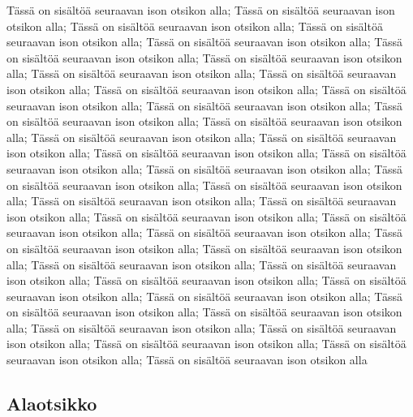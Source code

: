 \documentclass[a4paper]{article}
\begin{document}
Tässä on sisältöä seuraavan ison otsikon alla; Tässä on sisältöä seuraavan ison otsikon alla; Tässä on sisältöä seuraavan ison otsikon alla; Tässä on sisältöä seuraavan ison otsikon alla; Tässä on sisältöä seuraavan ison otsikon alla; Tässä on sisältöä seuraavan ison otsikon alla; Tässä on sisältöä seuraavan ison otsikon alla; Tässä on sisältöä seuraavan ison otsikon alla; Tässä on sisältöä seuraavan ison otsikon alla; Tässä on sisältöä seuraavan ison otsikon alla; Tässä on sisältöä seuraavan ison otsikon alla; Tässä on sisältöä seuraavan ison otsikon alla; Tässä on sisältöä seuraavan ison otsikon alla; Tässä on sisältöä seuraavan ison otsikon alla; Tässä on sisältöä seuraavan ison otsikon alla; Tässä on sisältöä seuraavan ison otsikon alla; Tässä on sisältöä seuraavan ison otsikon alla; Tässä on sisältöä seuraavan ison otsikon alla; Tässä on sisältöä seuraavan ison otsikon alla; Tässä on sisältöä seuraavan ison otsikon alla; Tässä on sisältöä seuraavan ison otsikon alla; Tässä on sisältöä seuraavan ison otsikon alla; Tässä on sisältöä seuraavan ison otsikon alla; Tässä on sisältöä seuraavan ison otsikon alla; Tässä on sisältöä seuraavan ison otsikon alla; Tässä on sisältöä seuraavan ison otsikon alla; Tässä on sisältöä seuraavan ison otsikon alla; Tässä on sisältöä seuraavan ison otsikon alla; Tässä on sisältöä seuraavan ison otsikon alla; Tässä on sisältöä seuraavan ison otsikon alla; Tässä on sisältöä seuraavan ison otsikon alla; Tässä on sisältöä seuraavan ison otsikon alla; Tässä on sisältöä seuraavan ison otsikon alla; Tässä on sisältöä seuraavan ison otsikon alla; Tässä on sisältöä seuraavan ison otsikon alla; Tässä on sisältöä seuraavan ison otsikon alla; Tässä on sisältöä seuraavan ison otsikon alla; Tässä on sisältöä seuraavan ison otsikon alla; Tässä on sisältöä seuraavan ison otsikon alla; Tässä on sisältöä seuraavan ison otsikon alla

\subsection{Alaotsikko}
\end{document}
